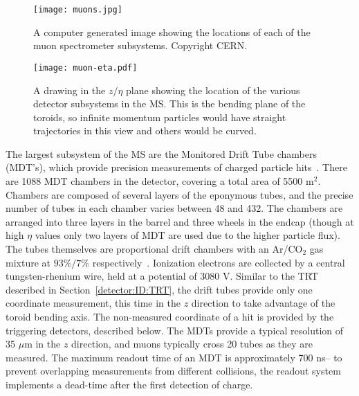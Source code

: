 
\begin{figure}
\centering
\texttt{[image: muons.jpg]}
\label{fig:detector:ms}
\caption{A computer generated image showing the locations of each of the muon spectrometer subsystems. Copyright CERN.}
\end{figure}



\begin{figure}
\centering
\texttt{[image: muon-eta.pdf]}
\label{fig:detector:ms-eta}
\caption{A drawing in the $z/\eta$ plane showing the location of the various detector subsystems in the MS. This is the bending plane of the toroids, so infinite momentum particles would have straight trajectories in this view and others would be curved.}
\end{figure}


The largest subsystem of the MS are the Monitored Drift Tube chambers (MDT's), which provide precision measurements of charged particle hits~\cite{ATLASPaper}. There are 1088 MDT chambers in the detector, covering a total area of 5500 m$^2$. Chambers are composed of several layers of the eponymous tubes, and the precise number of tubes in each chamber varies between 48 and 432. The chambers are arranged into three layers in the barrel and three wheels in the endcap (though at high $\eta$ values only two layers of MDT are used due to the higher particle flux). The tubes themselves are proportional drift chambers with an Ar/CO$_2$ gas mixture at $93\%/7\%$ respectively~\cite{ATLASPaper,Detectors}. Ionization electrons are collected by a central tungsten-rhenium wire, held at a potential of 3080 V. Similar to the TRT described in Section~\ref{detector:ID:TRT}, the drift tubes provide only one coordinate measurement, this time in the $z$ direction to take advantage of the toroid bending axis. The non-measured coordinate of a hit is provided by the triggering detectors, described below. The MDTs provide a typical resolution of 35 $\mu$m in the $z$ direction, and muons typically cross 20 tubes as they are measured. The maximum readout time of an MDT is approximately 700 ns-- to prevent overlapping measurements from different collisions, the readout system implements a dead-time after the first detection of charge.
 
